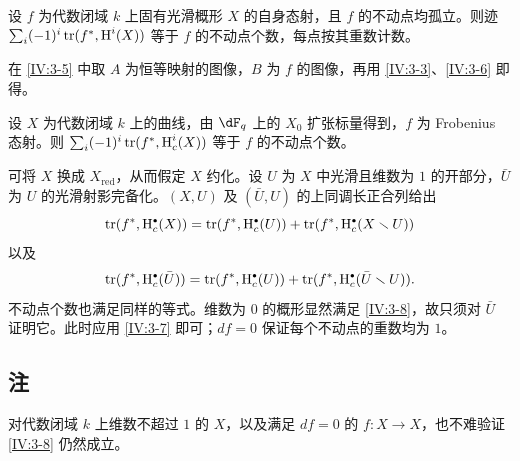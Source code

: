 \begin{corollary_}\label{IV:3-7}
设 $f$ 为代数闭域 $k$ 上固有光滑概形 $X$ 的自身态射，且 $f$ 的不动点均孤立。则迹 $\sum_i(-1)^i\operatorname{tr}(f^*,\operatorname{H}^i(X))$ 等于 $f$ 的不动点个数，每点按其重数计数。
\end{corollary_}
在 \ref{IV:3-5} 中取 $A$ 为恒等映射的图像，$B$ 为 $f$ 的图像，再用 \ref{IV:3-3}、\ref{IV:3-6} 即得。

\begin{corollary_}\label{IV:3-8}
设 $X$ 为代数闭域 $k$ 上的曲线，由 $\dF_q$ 上的 $X_0$ 扩张标量得到，$f$ 为 Frobenius 态射。则 $\sum_i(-1)^i\operatorname{tr}(f^*,\operatorname{H}_c^i(X))$ 等于 $f$ 的不动点个数。
\end{corollary_}
可将 $X$ 换成 $X_{\text{red}}$，从而假定 $X$ 约化。设 $U$ 为 $X$ 中光滑且维数为 $1$ 的开部分，$\bar U$ 为 $U$ 的光滑射影完备化。$(X,U)$ 及 $(\bar U,U)$ 的上同调长正合列给出
\[
\tr(f^*,\h_c^\bullet(X))=\tr(f^*,\h_c^\bullet(U))+
\tr(f^*,\h_c^\bullet(X\setminus U))
\]
以及
\[
\tr(f^*,\h_c^\bullet(\bar U))=\tr(f^*,\h_c^\bullet(U))+
\tr(f^*,\h_c^\bullet(\bar U\setminus U)).
\]
不动点个数也满足同样的等式。维数为 $0$ 的概形显然满足 \ref{IV:3-8}，故只须对 $\bar U$ 证明它。此时应用 \ref{IV:3-7} 即可；$df=0$ 保证每个不动点的重数均为 $1$。

\subsection{注}\label{IV:3-9}
对代数闭域 $k$ 上维数不超过 $1$ 的 $X$，以及满足 $df=0$ 的 $f:X\to X$，也不难验证 \ref{IV:3-8} 仍然成立。
